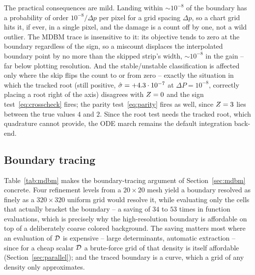 The practical consequences are mild. Landing within $\sim10^{-8}$ of the
boundary has a probability of order $10^{-8}/\Delta p$ per pixel for a grid
spacing $\Delta p$, so a chart grid hits it, if ever, in a single pixel, and
the damage is a count off by one, not a wild outlier. The
MDBM trace is insensitive to it: its objective tends to zero at the
boundary regardless of the sign, so a miscount displaces the interpolated
boundary point by no more than the skipped strip's width, $\sim10^{-8}$ in
the gain -- far below plotting resolution. And the stable/unstable
classification is affected only where the skip flips the count to or from
zero -- exactly the situation in which the tracked root (still positive,
$\hat{\sigma}=+4.3\cdot10^{-7}$ at $\Delta P=10^{-8}$, correctly placing a root
right of the axis) disagrees with $Z=0$ and the sign
test~\eqref{eq:crosscheck} fires; the parity test~\eqref{eq:parity} fires as
well, since $Z=3$ lies between the true values $4$ and $2$. Since the
root test needs the tracked root, which quadrature cannot provide, the ODE
march remains the default integration back-end.

\subsection{Boundary tracing}\label{sec:performance-mdbm}

\begin{table}[tb]
  \centering
  \caption{What the MDBM boundary trace buys: from an initial mesh with the
  listed refinement levels, the traced boundary has the equivalent resolution
  of a uniform grid of the given size, at the listed number of function
  evaluations. The saving factor is the ratio of the two point
  counts.}\label{tab:mdbm}
\end{table}

Table~\ref{tab:mdbm} makes the boundary-tracing argument of
Section~\ref{sec:mdbm} concrete. Four refinement levels from a
$20\times20$ mesh yield a boundary resolved as finely as a
$320\times320$ uniform grid would resolve it, while evaluating only the
cells that actually bracket the boundary -- a saving of $34$ to $53$ times in
function evaluations, which is precisely why the high-resolution boundary is
affordable on top of a deliberately coarse colored background. The saving
matters most where an evaluation of $\mathcal{D}$ is expensive -- large
determinants, automatic extraction -- since for a cheap scalar $\mathcal{D}$ a
brute-force grid of that density is itself affordable
(Section~\ref{sec:parallel}); and the traced boundary is a curve, which a
grid of any density only approximates.

